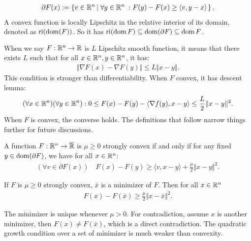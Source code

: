 \documentclass[12pt]{article}
\begin{document}
        \begin{align*}
            \partial F(x) := \left\lbrace
                v \in \mathbb R^n \left|\; 
                    \forall y \in \mathbb R^n\; :  F(y) - F(x)  \ge \langle v, y - x\rangle
                \right.
            \right\rbrace. 
        \end{align*}
        A convex function is locally Lipschitz in the relative interior of its domain, denoted as $\operatorname{ri}(\operatorname{dom}(F))$. 
        So it has $\operatorname{ri}(\operatorname{dom} F)\subseteq \operatorname{dom}(\partial F) \subseteq \operatorname{dom} F$. 
        \par
        When we say $F:\mathbb R^n \rightarrow \mathbb R$ is $L$ Lipschitz smooth function, it means that there exists $L$ such that for all $x\in \mathbb R^n, y \in \mathbb R^n$, it has: 
        \begin{align*}
            \Vert \nabla F(x) - \nabla F(y)\Vert \le L \Vert x - y\Vert. 
        \end{align*}
        This condition is stronger than differentiability. 
        When $F$ convex, it has descent lemma: 
        \begin{align*}
            (\forall x \in \mathbb R^n)(\forall y \in \mathbb R^n): 0 \le 
            F(x) - F(y) - \langle \nabla f(y), x - y\rangle \le \frac{L}{2}\Vert x - y\Vert^2. 
        \end{align*}
        When $F$ is convex, the converse holds. 
        The definitions that follow narrow things further for future discussions. 
        \begin{definition}\label{def:s-cnvx}
            A function $F:\mathbb R^n \rightarrow \overline {\mathbb R}$ is $\mu \ge 0$ strongly convex if and only if for any fixed $y \in \operatorname{dom}(\partial F)$, we have for all $x\in \mathbb R^n$: 
            \begin{align*}
                (\forall v \in \partial F(x))\quad 
                F(x) - F(y) \ge \langle v, x - y\rangle + \frac{\mu}{2}\Vert x - y\Vert^2. 
            \end{align*}
        \end{definition}
        \begin{lemma}\label{lemma:q-growth}
            If $F$ is $\mu \ge 0$ strongly convex, $\bar x$ is a minimizer of $F$. 
            Then for all $x \in \mathbb R^n$
            \begin{align*}
                F(x) - F(\bar x) \ge \frac{\mu}{2}\Vert x - \bar x\Vert^2. 
            \end{align*}
        \end{lemma}
        \begin{remark}
            The minimizer is unique whenever $\mu > 0$. 
            For contradiction, assume $x$ is another minimizer, then $F(x) \neq F(\bar x)$, which is a direct contradiction. 
            The quadratic growth condition over a set of minimizer is much weaker than convexity. 
        \end{remark}
        
\end{document}
